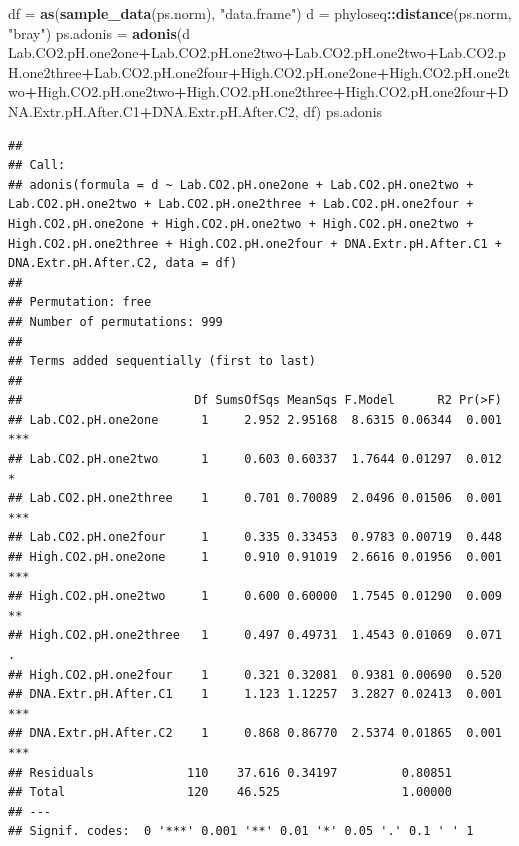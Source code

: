 \documentclass[]{article}
\newenvironment{Shaded}{\begin{snugshade}}{\end{snugshade}}
\newcommand{\KeywordTok}[1]{\textcolor[rgb]{0.13,0.29,0.53}{\textbf{#1}}}
\newcommand{\NormalTok}[1]{#1}
\newcommand{\OperatorTok}[1]{\textcolor[rgb]{0.81,0.36,0.00}{\textbf{#1}}}
\newcommand{\StringTok}[1]{\textcolor[rgb]{0.31,0.60,0.02}{#1}}
\begin{document}
\begin{Shaded}
\begin{Highlighting}[]
\NormalTok{df =}\StringTok{ }\KeywordTok{as}\NormalTok{(}\KeywordTok{sample_data}\NormalTok{(ps.norm), }\StringTok{"data.frame"}\NormalTok{)}
\NormalTok{d =}\StringTok{ }\NormalTok{phyloseq}\OperatorTok{::}\KeywordTok{distance}\NormalTok{(ps.norm, }\StringTok{"bray"}\NormalTok{) }
\NormalTok{ps.adonis =}\StringTok{ }\KeywordTok{adonis}\NormalTok{(d }\OperatorTok{~}\StringTok{ }\NormalTok{Lab.CO2.pH.one2one}\OperatorTok{+}\NormalTok{Lab.CO2.pH.one2two}\OperatorTok{+}\NormalTok{Lab.CO2.pH.one2two}\OperatorTok{+}\NormalTok{Lab.CO2.pH.one2three}\OperatorTok{+}\NormalTok{Lab.CO2.pH.one2four}\OperatorTok{+}\NormalTok{High.CO2.pH.one2one}\OperatorTok{+}\NormalTok{High.CO2.pH.one2two}\OperatorTok{+}\NormalTok{High.CO2.pH.one2two}\OperatorTok{+}\NormalTok{High.CO2.pH.one2three}\OperatorTok{+}\NormalTok{High.CO2.pH.one2four}\OperatorTok{+}\NormalTok{DNA.Extr.pH.After.C1}\OperatorTok{+}\NormalTok{DNA.Extr.pH.After.C2, df)}
\NormalTok{ps.adonis}
\end{Highlighting}
\end{Shaded}

\begin{verbatim}
## 
## Call:
## adonis(formula = d ~ Lab.CO2.pH.one2one + Lab.CO2.pH.one2two +      Lab.CO2.pH.one2two + Lab.CO2.pH.one2three + Lab.CO2.pH.one2four +      High.CO2.pH.one2one + High.CO2.pH.one2two + High.CO2.pH.one2two +      High.CO2.pH.one2three + High.CO2.pH.one2four + DNA.Extr.pH.After.C1 +      DNA.Extr.pH.After.C2, data = df) 
## 
## Permutation: free
## Number of permutations: 999
## 
## Terms added sequentially (first to last)
## 
##                        Df SumsOfSqs MeanSqs F.Model      R2 Pr(>F)    
## Lab.CO2.pH.one2one      1     2.952 2.95168  8.6315 0.06344  0.001 ***
## Lab.CO2.pH.one2two      1     0.603 0.60337  1.7644 0.01297  0.012 *  
## Lab.CO2.pH.one2three    1     0.701 0.70089  2.0496 0.01506  0.001 ***
## Lab.CO2.pH.one2four     1     0.335 0.33453  0.9783 0.00719  0.448    
## High.CO2.pH.one2one     1     0.910 0.91019  2.6616 0.01956  0.001 ***
## High.CO2.pH.one2two     1     0.600 0.60000  1.7545 0.01290  0.009 ** 
## High.CO2.pH.one2three   1     0.497 0.49731  1.4543 0.01069  0.071 .  
## High.CO2.pH.one2four    1     0.321 0.32081  0.9381 0.00690  0.520    
## DNA.Extr.pH.After.C1    1     1.123 1.12257  3.2827 0.02413  0.001 ***
## DNA.Extr.pH.After.C2    1     0.868 0.86770  2.5374 0.01865  0.001 ***
## Residuals             110    37.616 0.34197         0.80851           
## Total                 120    46.525                 1.00000           
## ---
## Signif. codes:  0 '***' 0.001 '**' 0.01 '*' 0.05 '.' 0.1 ' ' 1
\end{verbatim}
\end{document}
